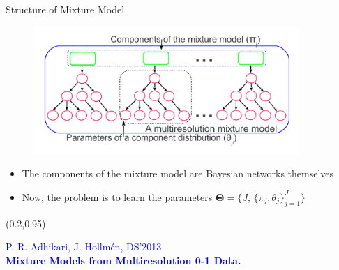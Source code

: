 \documentclass[first=dgreen,second=purple,logo=redexc]{aaltoslides}
\newcommand\FrameText[1]{%
  \begin{textblock*}{0.98\textwidth}(0.2\textwidth,0.95\textheight)
    \textcolor {blue}{\scriptsize\raggedright #1\hspace{0.1\textwidth}}
  \end{textblock*}}
\begin{document}


\begin{frame} {Structure of Mixture Model} 

      \begin{figure}
      \centering
      \includegraphics[trim=1cm 1.5cm 1cm 1cm, clip=true, width=0.9\textwidth]{figures/mixtrees}
      \end{figure}
      
      \begin{itemize}\setlength{\itemsep}{1mm}
      
\small
\item The components of the mixture model are Bayesian networks themselves 
\item Now, the problem is to learn the parameters $ \boldsymbol{\Theta}=\{J$, $\{ \pi_j,\theta_j\}_{j=1}^{J}\}$
\end{itemize}
\FrameText{P. R. Adhikari, J. Hollm{\'e}n, DS'2013 \\ \vspace{-2mm} \textbf{Mixture Models from Multiresolution 0-1 Data.}}

\end{frame}

\end{document}
